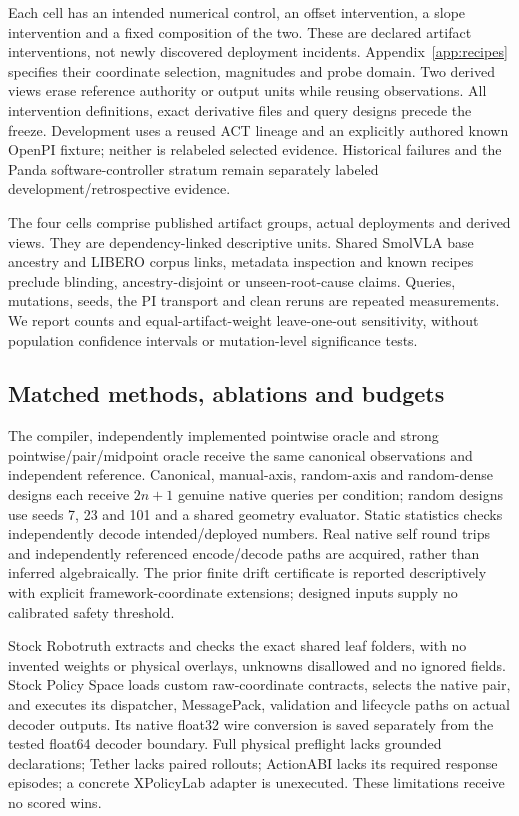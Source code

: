 Each cell has an intended numerical control, an offset intervention, a slope intervention and a fixed composition of the two. These are declared artifact interventions, not newly discovered deployment incidents. Appendix~\ref{app:recipes} specifies their coordinate selection, magnitudes and probe domain. Two derived views erase reference authority or output units while reusing observations. All intervention definitions, exact derivative files and query designs precede the freeze. Development uses a reused ACT lineage and an explicitly authored known OpenPI fixture; neither is relabeled selected evidence. Historical failures and the Panda software-controller stratum remain separately labeled development/retrospective evidence.

The four cells comprise \MainGroups{} published artifact groups, \MainConditions{} actual deployments and \MainDerived{} derived views. They are dependency-linked descriptive units. Shared SmolVLA base ancestry and LIBERO corpus links, metadata inspection and known recipes preclude blinding, ancestry-disjoint or unseen-root-cause claims. Queries, mutations, seeds, the PI transport and clean reruns are repeated measurements. We report counts and equal-artifact-weight leave-one-out sensitivity, without population confidence intervals or mutation-level significance tests.

\subsection{Matched methods, ablations and budgets}
The compiler, independently implemented pointwise oracle and strong pointwise/pair/midpoint oracle receive the same canonical observations and independent reference. Canonical, manual-axis, random-axis and random-dense designs each receive $2n+1$ genuine native queries per condition; random designs use seeds 7, 23 and 101 and a shared geometry evaluator. Static statistics checks independently decode intended/deployed numbers. Real native self round trips and independently referenced encode/decode paths are acquired, rather than inferred algebraically. The prior finite drift certificate is reported descriptively with explicit framework-coordinate extensions; designed inputs supply no calibrated safety threshold.

Stock Robotruth extracts and checks the exact shared leaf folders, with no invented weights or physical overlays, unknowns disallowed and no ignored fields. Stock Policy Space loads custom raw-coordinate contracts, selects the native pair, and executes its dispatcher, MessagePack, validation and lifecycle paths on actual decoder outputs. Its native float32 wire conversion is saved separately from the tested float64 decoder boundary. Full physical preflight lacks grounded declarations; Tether lacks paired rollouts; ActionABI lacks its required response episodes; a concrete XPolicyLab adapter is unexecuted. These limitations receive no scored wins.


